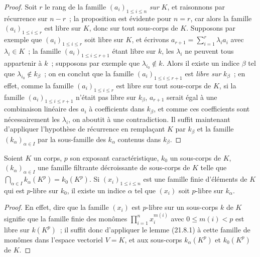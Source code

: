 \begin{proof}
Soit $r$ le rang de la famille $(a_i)_{1\leqslant i\leqslant n}$ \emph{sur} $K$, et
raisonnons par récurrence sur $n-r$~; la proposition est évidente pour $n=r$,
car alors la famille $(a_i)_{1\leqslant i\leqslant r}$ est libre sur $K$, donc
sur tout sous-corps de $K$. Supposons par exemple que
$(a_i)_{1\leqslant i\leqslant r}$ soit libre sur $K$, et écrivons
$a_{r+1}=\sum_{i=1}^r\lambda_i a_i$ avec $\lambda_i\in K$~; la famille
$(a_i)_{1\leqslant i\leqslant r+1}$ étant libre sur $k$, les $\lambda_i$ ne
peuvent tous appartenir à $k$~; supposons par exemple que
$\lambda_{i_0}\notin k$. Alors il existe un indice $\beta$ tel que
$\lambda_{i_0}\notin k_\beta$~; on en conclut que la famille $(a_i)_{1\leqslant i\leqslant r+1}$ est \emph{libre sur} $k_\beta$~; en effet, comme la
famille $(a_i)_{1\leqslant i\leqslant r}$ est libre sur tout sous-corps de
$K$, si la famille $(a_i)_{1\leqslant i\leqslant r+1}$ n'était pas libre sur
$k_\beta$, $a_{r+1}$ serait égal à une combinaison linéaire des $a_i$ à
coefficients dans $k_\beta$, et comme ces coefficients sont nécessairement
les $\lambda_i$, on aboutit à une contradiction. Il suffit maintenant
d'appliquer l'hypothèse de récurrence en remplaçant $K$ par $k_\beta$ et la
famille $(k_\alpha)_{\alpha\in I}$ par la sous-famille des $k_\alpha$
contenus dans $k_\beta$.
\end{proof}

\begin{lemma}[21.8.2]
\label{0.21.8.2-fr}
Soient $K$ un corps, $p$ son exposant caractéristique, $k_0$ un sous-corps de
$K$, $(k_\alpha)_{\alpha\in I}$ une famille filtrante décroissante de
sous-corps de $K$ telle que $\bigcap_{\alpha\in I}k_\alpha(K^p)=k_0(K^p)$.
Si $(x_i)_{1\leqslant i\leqslant n}$ est une famille finie d'éléments de $K$
qui est $p$-libre sur $k_0$, il existe un indice $\alpha$ tel que $(x_i)$ soit
$p$-libre sur $k_\alpha$.
\end{lemma}

\begin{proof}
En effet, dire que la famille $(x_i)$ est $p$-libre sur un sous-corps $k$
de $K$ signifie que la famille finie des monômes
$\prod_{i=1}^n x_i^{m(i)}$ avec $0\leqslant m(i)<p$ est libre sur $k(K^p)$~;
il suffit donc d'appliquer le lemme (21.8.1) à cette famille de monômes dans
l'espace vectoriel $V=K$, et aux sous-corps $k_\alpha(K^p)$ et $k_0(K^p)$
de $K$.
\end{proof}

